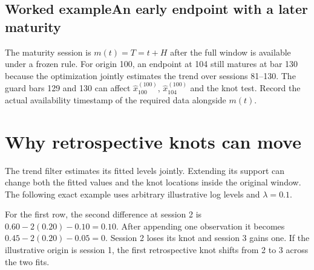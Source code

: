 \documentclass[10pt,letterpaper]{article}
\begin{document}
\clearpage
\subsection*{Worked example\quad An early endpoint with a later maturity}

The maturity session is \(m(t)=T=t+H\) after the full window is available under a frozen rule. For origin 100, an endpoint at 104 still matures at bar 130 because the optimization jointly estimates the trend over sessions 81--130. The guard bars 129 and 130 can affect \(\widehat x^{(100)}_{100}\), \(\widehat x^{(100)}_{104}\) and the knot test. Record the actual availability timestamp of the required data alongside \(m(t)\).\par

\section{Why retrospective knots can move}

The trend filter estimates its fitted levels jointly. Extending its support can change both the fitted values and the knot locations inside the original window. The following exact example uses arbitrary illustrative log levels and \(\lambda=0.1\).\par

\par{}\par\smallskip

For the first row, the second difference at session 2 is \(0.60-2(0.20)-0.10=0.10\). After appending one observation it becomes \(0.45-2(0.20)-0.05=0\). Session 2 loses its knot and session 3 gains one. If the illustrative origin is session 1, the first retrospective knot shifts from 2 to 3 across the two fits.\par
\end{document}
